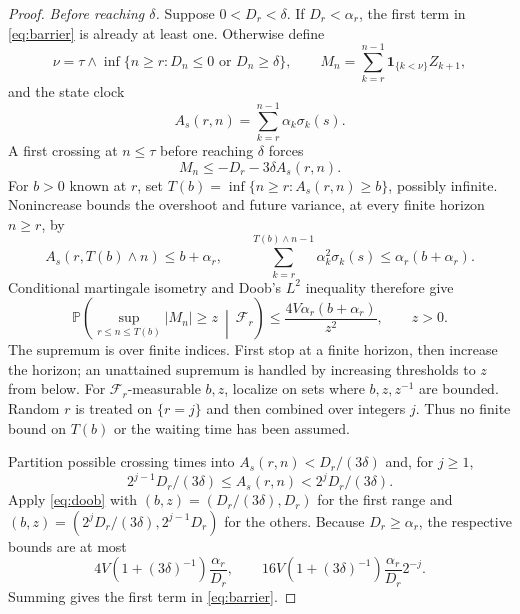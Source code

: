 \begin{proof}
\emph{Before reaching $\delta$.} Suppose $0<D_r<\delta$. If $D_r<\alpha_r$, the first term in \eqref{eq:barrier} is already
at least one. Otherwise define
\[
\nu=\tau\wedge\inf\{n\ge r:D_n\le0\text{ or }D_n\ge\delta\},\qquad
M_n=\sum_{k=r}^{n-1}\mathbf1_{\{k<\nu\}}Z_{k+1},
\]
and the state clock
\begin{equation}\label{eq:clock}
A_s(r,n)=\sum_{k=r}^{n-1}\alpha_k\sigma_k(s).
\end{equation}
A first crossing at $n\le\tau$ before reaching $\delta$ forces
\begin{equation}\label{eq:crossing}
M_n\le-D_r-3\delta A_s(r,n).
\end{equation}
For $b>0$ known at $r$, set $T(b)=\inf\{n\ge r:A_s(r,n)\ge b\}$, possibly infinite. Nonincrease
bounds the overshoot and future variance, at every finite horizon $n\ge r$, by
\[
A_s(r,T(b)\wedge n)\le b+\alpha_r,\qquad
\sum_{k=r}^{T(b)\wedge n-1}\alpha_k^2\sigma_k(s)\le\alpha_r(b+\alpha_r).
\]
Conditional martingale isometry and Doob's $L^2$ inequality therefore give
\begin{equation}\label{eq:doob}
\mathbb P\!\left(\sup_{r\le n\le T(b)}|M_n|\ge z\ \middle|\ \mathcal F_r\right)
\le\frac{4V\alpha_r(b+\alpha_r)}{z^2},\qquad z>0.
\end{equation}
The supremum is over finite indices. First stop at a finite horizon, then increase the horizon;
an unattained supremum is handled by increasing thresholds to $z$ from below. For $\mathcal F_r$-measurable $b,z$, localize on sets where $b,z,z^{-1}$ are bounded. Random $r$ is treated on $\{r=j\}$
and then combined over integers $j$. Thus no finite bound on $T(b)$ or the waiting time has
been assumed.

Partition possible crossing times into $A_s(r,n)<D_r/(3\delta)$ and, for $j\ge1$,
\[
2^{j-1}D_r/(3\delta)\le A_s(r,n)<2^jD_r/(3\delta).
\]
Apply \eqref{eq:doob} with $(b,z)=(D_r/(3\delta),D_r)$ for the first range and $(b,z)=(2^jD_r/(3\delta),2^{j-1}D_r)$
for the others. Because $D_r\ge\alpha_r$, the respective bounds are at most
\[
4V(1+(3\delta)^{-1})\frac{\alpha_r}{D_r},\qquad
16V(1+(3\delta)^{-1})\frac{\alpha_r}{D_r}2^{-j}.
\]
Summing gives the first term in \eqref{eq:barrier}.


\end{proof}
